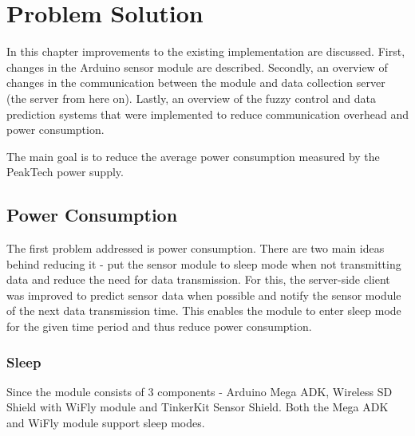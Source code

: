 
\chapter{Problem Solution} %

In this chapter improvements to the existing implementation are discussed. First, changes in the Arduino sensor module are described. Secondly, an overview of changes in the communication between the module and data collection server (the server from here on). Lastly, an overview of the fuzzy control and data prediction systems that were implemented to reduce communication overhead and power consumption.

The main goal is to reduce the average power consumption measured by  the PeakTech power supply. 



\ifpdf
    \graphicspath{{X/figures/PNG/}{X/figures/PDF/}{X/figures/}}
\else
    \graphicspath{{X/figures/EPS/}{X/figures/}}
\fi

\section{Power Consumption}

The first problem addressed is power consumption. There are two main ideas behind reducing it - put the sensor module to sleep mode when not transmitting data and reduce the need for data transmission. For this, the server-side client was improved to predict sensor data when possible and notify the sensor module of the next data transmission time. This enables the module to enter sleep mode for the given time period and thus reduce power consumption. 

\subsection{Sleep}

Since the module consists of 3 components - Arduino Mega ADK, Wireless SD Shield with WiFly module and TinkerKit Sensor Shield. Both the Mega ADK and WiFly module support sleep modes. 

